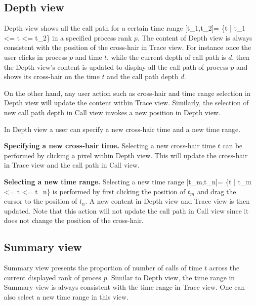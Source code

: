 \documentclass[english]{article}
\begin{document}
\subsection{Depth view}

Depth view shows all the call path for a certain time range [t_1,t_2]= \{t | t_1 <= t <= t_2\} in a specified process rank $p$. The content of Depth view is always consistent with the position of the cross-hair in Trace view.
For instance once the user clicks in process $p$ and time $t$, while the current depth of call path is $d$, then the Depth view's content is updated to display all the call path of process $p$ and shows its cross-hair on the time $t$ and the call path depth $d$.

On the other hand, any user action such as cross-hair and time range selection in Depth view will update the content within Trace view. Similarly, the selection of new call path depth in Call view invokes a new position in Depth view.

In Depth view a user can specify a new cross-hair time and a new time range.

\textbf{Specifying a new cross-hair time.} Selecting a new cross-hair time $t$ can be performed by clicking a pixel within Depth view. This will update the cross-hair in Trace view and the call path in Call view.

\textbf{Selecting a new time range.} Selecting a new time range [t_m,t_n]= \{t | t_m <= t <= t_n\} is performed by first clicking the position of $t_m$ and drag the cursor to the position of $t_n$. A new content in Depth view and Trace view is then updated. Note that this action will not update the call path in Call view since it does not change the position of the cross-hair.


\subsection{Summary view}

Summary view presents the proportion of number of calls of time $t$ across the current displayed rank of proces $p$. 
Similar to Depth view, the time range in Summary view is always consistent with the time range in Trace view.
One can also select a new time range in this view.
\end{document}
